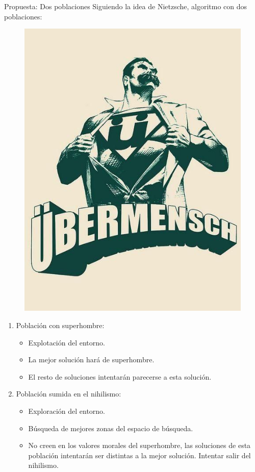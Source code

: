 \documentclass{beamer}
\begin{document}
\begin{frame}{Propuesta: Dos poblaciones}
Siguiendo la idea de Nietzsche, algoritmo con dos poblaciones:


\begin{minipage}{0.2\textwidth}
    	\begin{figure}
   		 	\hspace*{-0.8cm}\includegraphics[scale=0.3]{superhombre.png}   	
    	\end{figure}
    	
    \end{minipage}
    \hfill
\begin{minipage}{0.7\textwidth}	
	\begin{enumerate}
		\item Población con superhombre:
			\begin{itemize}
				\item Explotación del entorno. 
				\item La mejor solución hará de superhombre.
				\item El resto de soluciones intentarán parecerse a esta solución.
			\end{itemize}
		\item Población sumida en el nihilismo: 
			\begin{itemize}
				\item Exploración del entorno.
				\item Búsqueda de mejores zonas del espacio de búsqueda. 
				\item No creen en los valores morales del superhombre, las soluciones de esta población intentarán ser distintas a la mejor solución. Intentar salir del nihilismo.
			\end{itemize}


\end{enumerate}
\end{minipage}
\end{frame}
\end{document}

